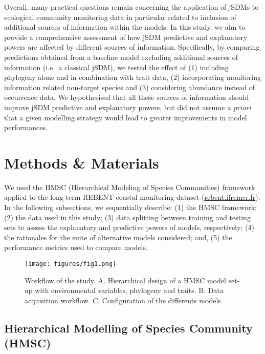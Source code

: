 \documentclass[9pt,biorxiv,doublespacing,lineno,endfloat]{lapreprint}
\begin{document}
Overall, many practical questions remain concerning the application of
jSDMs to ecological community monitoring data in particular related to
inclusion of additional sources of information within the models. In
this study, we aim to provide a comprehensive assessment of how jSDM
predictive and explanatory powers are affected by different sources of
information. Specifically, by comparing predictions obtained from a
baseline model excluding additional sources of information (i.e.~a
classical jSDM), we tested the effect of (1) including phylogeny alone
and in combination with trait data, (2) incorporating monitoring
information related non-target species and (3) considering abundance
instead of occurrence data. We hypothesised that all these sources of
information should improve jSDM predictive and explanatory powers, but
did not assume \emph{a priori} that a given modelling strategy would
lead to greater improvements in model performances.

\hypertarget{methods-materials}{%
\section{Methods \& Materials}\label{methods-materials}}

We used the HMSC (Hierarchical Modeling of Species Communities)
framework applied to the long-term REBENT coastal monitoring dataset
(\href{https://rebent.ifremer.fr}{rebent.ifremer.fr}). In the following
subsections, we sequentially describe: (1) the HMSC framework;(2) the
data used in this study; (3) data splitting between training and testing
sets to assess the explanatory and predictive powers of models,
respectively; (4) the rationales for the suite of alternative models
considered; and, (5) the performance metrics used to compare models.

\begin{figure}
\hypertarget{fig:workdlow}{%
\centering
\texttt{[image: figures/fig1.png]}
\caption{Workflow of the study. A. Hierarchical design of a HMSC model
set-up with environmental variables, phylogeny and traits. B. Data
acquisition workflow. C. Configuration of the differents
models.}\label{fig:workdlow}
}
\end{figure}

\hypertarget{hierarchical-modelling-of-species-community-hmsc}{%
\subsection{Hierarchical Modelling of Species Community
(HMSC)}\label{hierarchical-modelling-of-species-community-hmsc}}
\end{document}
